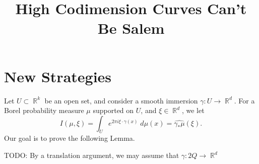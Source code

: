 \documentclass[dvipsnames,letterpaper,12pt]{article}
\title{High Codimension Curves Can't Be Salem}
\DeclareMathOperator{\RR}{\mathbb{R}}
\begin{document}
\maketitle

\section{New Strategies}

Let $U \subset \RR^k$ be an open set, and consider a smooth immersion $\gamma: U \to \RR^d$. For a Borel probability measure $\mu$ supported on $U$, and $\xi \in \RR^d$, we let
%
\[ I(\mu,\xi) = \int_U e^{2 \pi i \xi \cdot \gamma(x)}\; d\mu(x) = \widehat{\gamma_* \mu}(\xi). \]
%
Our goal is to prove the following Lemma.

TODO: By a translation argument, we may assume that $\gamma: 2Q \to \RR^d$
\end{document}
